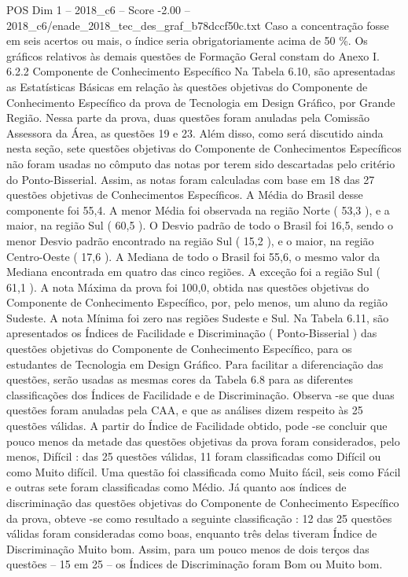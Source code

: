 \begin{textsample}{POS Dim 1 – 2018\_c6 – Score -2.00 – 2018\_c6/enade\_2018\_tec\_des\_graf\_b78dccf50c.txt}
Caso a concentração fosse em seis acertos ou mais, o índice seria obrigatoriamente acima de 50 \%.
Os gráficos relativos às demais questões de Formação Geral constam do Anexo I. 6.2.2 Componente de Conhecimento Específico Na Tabela 6.10, são apresentadas as Estatísticas Básicas em relação às questões objetivas do Componente de Conhecimento Específico da prova de Tecnologia em Design Gráfico, por Grande Região.
Nessa parte da prova, duas questões foram anuladas pela Comissão Assessora da Área, as questões 19 e 23.
Além disso, como será discutido ainda nesta seção, sete questões objetivas do Componente de Conhecimentos Específicos não foram usadas no cômputo das notas por terem sido descartadas pelo critério do Ponto-Bisserial.
Assim, as notas foram calculadas com base em 18 das 27 questões objetivas de Conhecimentos Específicos.
A Média do Brasil desse componente foi 55,4.
A menor Média foi observada na região Norte ( 53,3 ), e a maior, na região Sul ( 60,5 ).
O Desvio padrão de todo o Brasil foi 16,5, sendo o menor Desvio padrão encontrado na região Sul ( 15,2 ), e o maior, na região Centro-Oeste ( 17,6 ).
A Mediana de todo o Brasil foi 55,6, o mesmo valor da Mediana encontrada em quatro das cinco regiões.
A exceção foi a região Sul ( 61,1 ).
A nota Máxima da prova foi 100,0, obtida nas questões objetivas do Componente de Conhecimento Específico, por, pelo menos, um aluno da região Sudeste.
A nota Mínima foi zero nas regiões Sudeste e Sul.
Na Tabela 6.11, são apresentados os Índices de Facilidade e Discriminação ( Ponto-Bisserial ) das questões objetivas do Componente de Conhecimento Específico, para os estudantes de Tecnologia em Design Gráfico.
Para facilitar a diferenciação das questões, serão usadas as mesmas cores da Tabela 6.8 para as diferentes classificações dos Índices de Facilidade e de Discriminação.
Observa -se que duas questões foram anuladas pela CAA, e que as análises dizem respeito às 25 questões válidas.
A partir do Índice de Facilidade obtido, pode -se concluir que pouco menos da metade das questões objetivas da prova foram considerados, pelo menos, Difícil : das 25 questões válidas, 11 foram classificadas como Difícil ou como Muito difícil.
Uma questão foi classificada como Muito fácil, seis como Fácil e outras sete foram classificadas como Médio.
Já quanto aos índices de discriminação das questões objetivas do Componente de Conhecimento Específico da prova, obteve -se como resultado a seguinte classificação : 12 das 25 questões válidas foram consideradas como boas, enquanto três delas tiveram Índice de Discriminação Muito bom.
Assim, para um pouco menos de dois terços das questões – 15 em 25 – os Índices de Discriminação foram Bom ou Muito bom.

\end{textsample}

